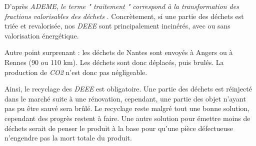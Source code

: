 D'après \textit{ADEME}\cite{ADEME_unite_traitement}, \og \textit{le terme " traitement " correspond à la transformation des fractions valorisables des déchets}  \fg{}. Concrètement, si une partie des déchets est triée et revalorisée, nos \textit{DEEE} sont principalement incinérés, avec ou sans valorisation énergétique. 

Autre point surprenant : les déchets de Nantes sont envoyés à Angers ou à Rennes (90 ou 110 km).   Les déchets sont donc déplacés, puis brulés. La production de \textit{CO2} n'est donc pas négligeable. 

\bigbreak

Ainsi, le recyclage des \textit{DEEE} est obligatoire. Une partie des déchets est réinjecté dans le marché suite à une rénovation, cependant, une partie des objet n'ayant pas pu être sauvé sera brûlé. Le recyclage reste malgré tout une bonne solution, cependant des progrès restent à faire. 
\medbreak
Une autre solution pour émettre moins de déchets serait de penser le produit à la base pour qu'une pièce défectueuse n'engendre pas la mort totale du produit. 

